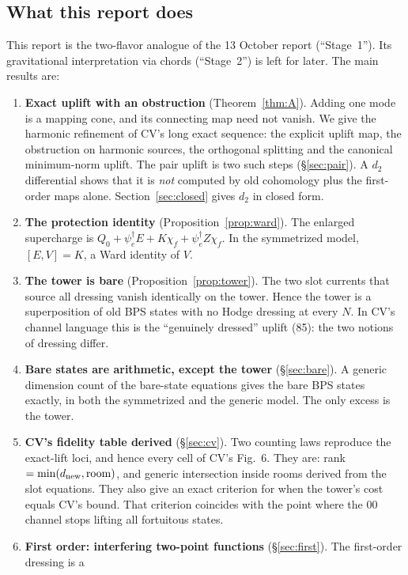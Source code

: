 \documentclass[11pt]{article}
\newcommand{\dnew}{d_{\rm new}}
\newcommand{\psie}{\psi_e}
\newcommand{\chif}{\chi_f}
\theoremstyle{plain}
\theoremstyle{remark}
\numberwithin{equation}{section}
\begin{document}
\subsection{What this report does}

This report is the two-flavor analogue of the 13 October report (``Stage~1''). Its gravitational interpretation via
chords (``Stage~2'') is left for later. The main results are:
\begin{enumerate}\itemsep3pt
\item[(i)] \textbf{Exact uplift with an obstruction} (Theorem~\ref{thm:A}). Adding one mode is a mapping cone, and its
  connecting map need not vanish. We give the harmonic refinement of CV's long exact sequence: the explicit uplift map,
  the obstruction on harmonic sources, the orthogonal splitting and the canonical minimum-norm uplift. The pair uplift is
  two such steps (\S\ref{sec:pair}). A $d_2$ differential shows that it is \emph{not} computed by old cohomology plus the
  first-order maps alone. Section~\ref{sec:closed} gives $d_2$ in closed form.
\item[(ii)] \textbf{The protection identity} (Proposition~\ref{prop:ward}). The enlarged supercharge is
  $Q_0+\psie^\dagger E+K\chif+\psie^\dagger Z\chif$. In the symmetrized model, $[E,V]=K$, a Ward identity of $V$.
\item[(iii)] \textbf{The tower is bare} (Proposition~\ref{prop:tower}). The two slot currents that source all dressing
  vanish identically on the tower. Hence the tower is a superposition of old BPS states with no Hodge dressing at every
  $N$. In CV's channel language this is the ``genuinely dressed'' uplift (85): the two notions of dressing differ.
\item[(iv)] \textbf{Bare states are arithmetic, except the tower} (\S\ref{sec:bare}). A generic dimension count of the
  bare-state equations gives the bare BPS states exactly, in both the symmetrized and the generic model. The only excess
  is the tower.
\item[(v)] \textbf{CV's fidelity table derived} (\S\ref{sec:cv}). Two counting laws reproduce the exact-lift loci, and
  hence every cell of CV's Fig.~6. They are: rank $=\min(\dnew,\text{room})$, and generic intersection inside rooms
  derived from the slot equations. They also give an exact criterion for when the tower's cost equals CV's bound. That
  criterion coincides with the point where the 00 channel stops lifting all fortuitous states.
\item[(vi)] \textbf{First order: interfering two-point functions} (\S\ref{sec:first}). The first-order dressing is a

\end{enumerate}
\end{document}
